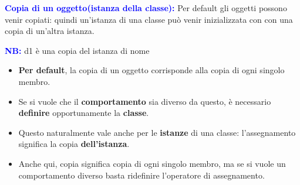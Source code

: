 \newpage
\textcolor{blue}{\textbf{Copia di un oggetto(istanza della classe):}}\newline\newline
Per default gli oggetti possono venir copiati: quindi un’istanza di una classe può venir inizializzata con con una copia di un’altra istanza.
\begin{tcolorbox}[width=12cm, boxsep=10pt]
    
    \textbf{\textcolor{blue}{NB:}} d1 è una copia del istanza  di nome 
\end{tcolorbox}
\begin{itemize}
    \item \textbf{Per default}, la copia di un oggetto corrisponde alla copia di
    ogni singolo membro.
    \item Se si vuole che il \textbf{comportamento} sia diverso da questo, è
    necessario \textbf{definire} opportunamente la \textbf{classe}.
    \item Questo naturalmente vale anche per le \textbf{istanze} di una
    classe: l’assegnamento significa la copia \textbf{dell’istanza}.
    \item Anche qui, copia significa copia di ogni singolo membro,
    ma se si vuole un comportamento diverso basta ridefinire
    l’operatore di assegnamento.
\end{itemize}
\newpage
